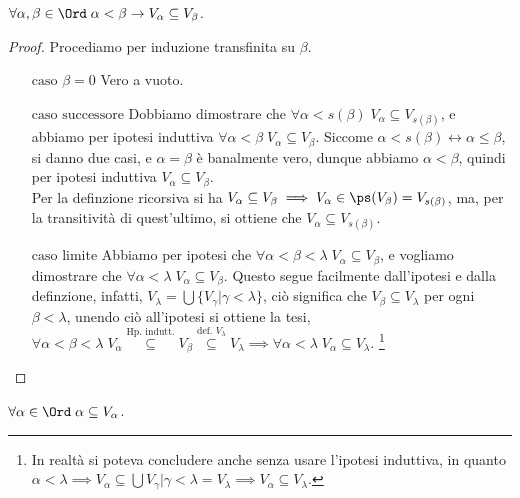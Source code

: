 \documentclass[11pt]{scrartcl}
\begin{document}
\begin{lemma}[``Ordinamento'' di $V_*$]
	$\forall \alpha, \beta \in \Ord \; \alpha < \beta \rightarrow V_\alpha \subseteq V_\beta$.
\end{lemma}

\begin{proof}
	Procediamo per induzione transfinita su $\beta$.
	\begin{itemize}
		\item[$\boxed{\text{caso $\beta = 0$}}$] Vero a vuoto.
		\item[$\boxed{\text{caso successore}}$] Dobbiamo dimostrare che $\forall \alpha < s(\beta) \; V_\alpha \subseteq V_{s(\beta)}$, e abbiamo per ipotesi induttiva $\forall \alpha < \beta \; V_\alpha \subseteq V_\beta$.
		Siccome $\alpha < s(\beta) \leftrightarrow \alpha \leq \beta$, si danno due casi, e $\alpha = \beta$ è banalmente vero, dunque abbiamo $\alpha < \beta$, quindi per ipotesi induttiva $V_\alpha \subseteq V_\beta$.\\
		Per la definzione ricorsiva si ha $V_\alpha \subseteq V_\beta \implies V_\alpha \in \ps(V_\beta) = V_{s(\beta)}$, ma, per la transitività di quest'ultimo, si ottiene che $V_\alpha \subseteq V_{s(\beta)}$.
		\item[$\boxed{\text{caso limite}}$] Abbiamo per ipotesi che $\forall \alpha < \beta < \lambda \; V_\alpha \subseteq V_\beta$, e vogliamo dimostrare che $\forall \alpha < \lambda \; V_\alpha \subseteq V_\beta$. Questo segue facilmente dall'ipotesi e dalla definzione,
		infatti, $V_\lambda = \bigcup\{V_\gamma | \gamma < \lambda\}$, ciò significa che $V_\beta \subseteq V_\lambda$ per ogni $\beta < \lambda$, unendo ciò all'ipotesi si ottiene la tesi, $\forall \alpha < \beta < \lambda \; V_\alpha \overset{\text{Hp. indutt.}}{\subseteq} V_\beta \overset{\text{def. $V_\lambda$}}{\subseteq} V_\lambda \implies \forall \alpha < \lambda\; V_\alpha \subseteq V_\lambda$.
		\footnote{In realtà si poteva concludere anche senza usare l'ipotesi induttiva, in quanto $\alpha < \lambda \implies V_\alpha \subseteq \bigcup{V_\gamma | \gamma < \lambda} = V_\lambda \implies V_\alpha \subseteq V_\lambda$.}
	\end{itemize}
\end{proof}

\begin{lemma}
	$\forall \alpha \in \Ord \; \alpha \subseteq V_\alpha$.
\end{lemma}
\end{document}
